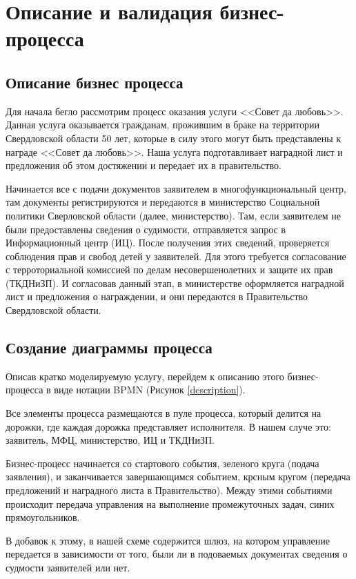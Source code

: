\chapter{Описание и валидация бизнес-процесса}

\section{Описание бизнес процесса}

Для начала бегло рассмотрим процесс оказания услуги <<Совет
да любовь>>. Данная услуга оказывается гражданам, прожившим
в браке на территории Свердловской области 50 лет, которые
в силу этого могут быть представлены к награде <<Совет да любовь>>.
Наша услуга подготавливает наградной лист и предложения об
этом достяжении и передает их в правительство.

Начинается все с подачи документов заявителем в многофункциональный
центр, там документы регистрируются и передаются в министерство
Социальной политики Сверловской области (далее, министерство).
Там, если заявителем не были предоставлены сведения о судимости,
отправляется запрос в Информационный центр (ИЦ).
После получения этих сведений, проверяется соблюдения прав
и свобод детей у заявителей. Для этого требуется согласование
с терроториальной комиссией по делам несовершенолетних
и защите их прав (ТКДНиЗП). И согласовав данный этап,
в министерстве оформляется наградной лист и предложения
о награждении, и они передаются в Правительство Свердловской
области.

\clearpage
\section{Создание диаграммы процесса}

Описав кратко моделируемую услугу, перейдем к описанию
этого бизнес-процесса в виде нотации BPMN (Рисунок \ref{description}).

Все элементы процесса размещаются в пуле процесса, который
делится на дорожки, где каждая дорожка представляет исполнителя.
В нашем случе это: заявитель, МФЦ, министерство, ИЦ и ТКДНиЗП.

Бизнес-процесс начинается со стартового события,
зеленого круга (подача заявления), и заканчивается
завершающимся событием, крсным кругом (передача предложений и
наградного листа в Правительство). Между этими событиями
происходит передача управления на выполнение промежуточных
задач, синих прямоугольников.

В добавок к этому, в нашей схеме содержится шлюз, на котором
управление передается в зависимости от того, были
ли в подоваемых документах сведения о судмости заявителей или нет.

